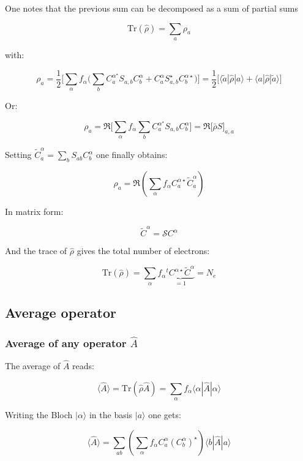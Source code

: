 \documentclass{article}
\newcommand{\bra}[1]{\langle #1|}
\newcommand{\ket}[1]{|#1\rangle}
\newcommand{\op}[1]{\hat{#1}}
\begin{document}
\noindent One notes that the previous sum can be decomposed as a sum of partial sums

\[ \displaystyle \mbox{Tr}(\op{\rho})=\sum_{a} \rho_{a} \]

\noindent
with:

\[\rho_{a }=\frac{1}{2}\Bigg[\sum_{\alpha } f_{\alpha}
\Bigg( \sum_{b} C_{a}^{\alpha^{\star}}S_{a,b}C_{b}^{\alpha}+ C_{a}^{\alpha}S_{a,b}^{\star}
C_{b}^{\alpha \star} \Bigg)\Bigg]= 
\frac{1}{2} \Big[ \bra{\tilde{a}} \op{\rho} \ket{a} + \bra{a} \op{\rho} \ket{\tilde{a}}  \Big]\]

\noindent Or:

\[\rho_{a}=\Re \Bigg[\sum_{\alpha} f_{\alpha}
\sum_{b} C_{a}^{\alpha^{\star}}S_{a,b}C_{b}^{\alpha}\Bigg]
= \Re \Bigg[\bar{\rho}S \Bigg]_{a,a}\]


\noindent
Setting $\displaystyle \widetilde{C}_{a}^{\alpha}=\sum_{b } S_{ab} C_{b}^{\alpha}$
\noindent
one finally obtains:

\[\displaystyle \rho_{a}= \Re \left( \sum_{\alpha} f_{\alpha} C_{a}^{\alpha \star}\widetilde{C}_{a}^{\alpha }
 \right)\]

\noindent
In matrix form:

\[ \widetilde{C}^{\alpha}=\mathcal{S}C^{\alpha} \]

\noindent
And the trace of $\op{\rho}$ gives the total number of electrons:

\[ \mbox{Tr} (\op{\rho })= \sum_{\alpha } f_{\alpha}
\underbrace{^tC^{\alpha \star}\widetilde{C}^{\alpha}}_{=1} =N_e\]

\subsection{Average operator}


\subsubsection{Average of any operator $\op{A}$}


\noindent The average of $\op{A}$ reads:

\[ \langle \op{A} \rangle =\mbox{Tr} (\op{\rho}\op{A})=\sum_{\alpha}f_{\alpha}
\bra{\alpha}\op{A}\ket{\alpha}\]

\noindent
Writing the Bloch $\ket{\alpha}$ in the basis $\ket{a}$ one gets:


\[ \displaystyle  \langle\op{A}\rangle=  \sum_{a  b} 
\left( \sum_{\alpha}  f_{\alpha}
C_{a }^{\alpha}(C_{b}^{\alpha})^{\star} \right)   
\bra{ b } \op{A} \ket{a} \]
\end{document}
